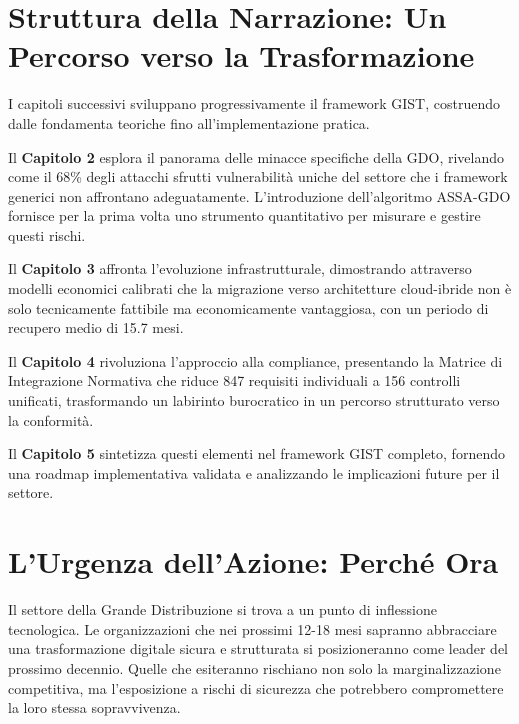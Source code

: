 \section{Struttura della Narrazione: Un Percorso verso la Trasformazione}

I capitoli successivi sviluppano progressivamente il framework GIST, costruendo dalle fondamenta teoriche fino all'implementazione pratica.

Il \textbf{Capitolo 2} esplora il panorama delle minacce specifiche della GDO, rivelando come il 68\% degli attacchi sfrutti vulnerabilità uniche del settore che i framework generici non affrontano adeguatamente. L'introduzione dell'algoritmo ASSA-GDO fornisce per la prima volta uno strumento quantitativo per misurare e gestire questi rischi.

Il \textbf{Capitolo 3} affronta l'evoluzione infrastrutturale, dimostrando attraverso modelli economici calibrati che la migrazione verso architetture cloud-ibride non è solo tecnicamente fattibile ma economicamente vantaggiosa, con un periodo di recupero medio di 15.7 mesi.

Il \textbf{Capitolo 4} rivoluziona l'approccio alla compliance, presentando la Matrice di Integrazione Normativa che riduce 847 requisiti individuali a 156 controlli unificati, trasformando un labirinto burocratico in un percorso strutturato verso la conformità.

Il \textbf{Capitolo 5} sintetizza questi elementi nel framework GIST completo, fornendo una roadmap implementativa validata e analizzando le implicazioni future per il settore.


\section{L'Urgenza dell'Azione: Perché Ora}

Il settore della Grande Distribuzione si trova a un punto di inflessione tecnologica. Le organizzazioni che nei prossimi 12-18 mesi sapranno abbracciare una trasformazione digitale sicura e strutturata si posizioneranno come leader del prossimo decennio. Quelle che esiteranno rischiano non solo la marginalizzazione competitiva, ma l'esposizione a rischi di sicurezza che potrebbero compromettere la loro stessa sopravvivenza.

